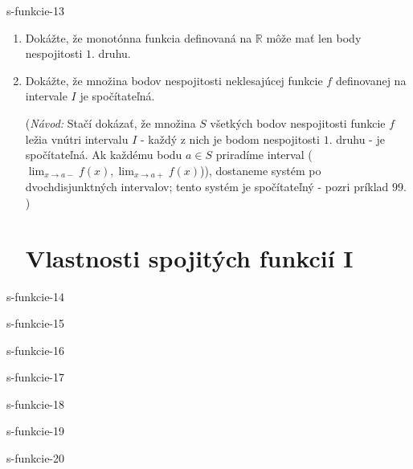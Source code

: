 	\begin{defproblem}{s-funkcie-13}
	\begin{enumerate}
	\item Dokážte, že monotónna funkcia definovaná na $\mathbb{R}$ môže mať len body nespojitosti $1.$ druhu.
	\item Dokážte, že množina bodov nespojitosti neklesajúcej funkcie $f$ definovanej na intervale $I$ je spočítateľná.
	
	(\textit{Návod:} Stačí dokázať, že množina $S$ všetkých bodov nespojitosti funkcie $f$ ležia vnútri intervalu $I$ - každý z nich je bodom nespojitosti $1.$ druhu - je spočítateľná. Ak každému bodu $a \in S$ priradíme interval ($\lim_{x \rightarrow a-}f(x),\lim_{x \rightarrow a+}f(x)$)), dostaneme systém po dvochdisjunktných intervalov; tento systém je spočítateľný - pozri príklad $99$. )
	
	\section{Vlastnosti spojitých funkcií I}
	\end{enumerate}
	\end{defproblem}
	
	\begin{defproblem}{s-funkcie-14}
	
	\end{defproblem}
	
	\begin{defproblem}{s-funkcie-15}
	
	\end{defproblem}
	
	\begin{defproblem}{s-funkcie-16}
	
	\end{defproblem}
	
	\begin{defproblem}{s-funkcie-17}
	
	\end{defproblem}
	
	\begin{defproblem}{s-funkcie-18}
	
	\end{defproblem}
	
	\begin{defproblem}{s-funkcie-19}
	
	\end{defproblem}
	
	\begin{defproblem}{s-funkcie-20}
	
	\end{defproblem}
	
